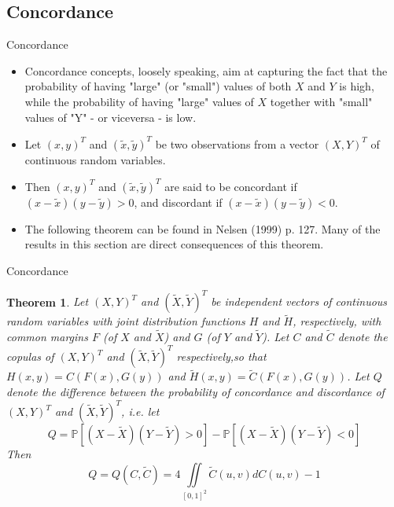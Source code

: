 \documentclass[11pt]{beamer}
\theoremstyle{plain}
\newtheorem{thm}{Theorem}[section]
\theoremstyle{definition}
\theoremstyle{remark}
\begin{document}
\subsection{Concordance}

\begin{frame}{Concordance}
   \begin{itemize}
      \item   				  						  
		Concordance concepts, loosely speaking, aim at capturing the fact that the 
		probability of having "large" (or "small") values of both $X$ and $Y$ is high, while 
		the probability of having "large" values of $X$ together with "small" values of "Y" 
		- or viceversa - is low.
	  \item 
	  	Let $(x, y)^T$ and $(\tilde x, \tilde y)^T$ be two observations from a vector $(X, Y 
	  	)^T$ of continuous random variables. 
	  \item		  	
	  	Then $(x, y)^T$ and $(\tilde x, \tilde y)^T$ 
	  	are said to be concordant if $(x - \tilde x)(y - \tilde y) > 0$, and discordant if $
	  	(x-\tilde x)(y-\tilde y) < 0$.
	  \item 
		The following theorem can be found in Nelsen (1999) p. 127. Many of the results in 	
		this section are direct consequences of this theorem.
   \end{itemize}
\end{frame}
%
\begin{frame}{Concordance}
	\begin{thm}
	Let $(X, Y )^T$ and $(\tilde X, \tilde Y )^T$ be independent vectors of continuous random variables with joint distribution functions $H$ 
	and $\tilde H$, respectively, with common margins $F$ (of $X$ and $\tilde X$) and $G$ (of $Y$ and $\tilde Y$). Let $C$ and $\tilde C
	$ denote the copulas of $(X, Y )^T$ and $(\tilde X, \tilde Y )^T$ respectively,so that $H(x,y)=C(F(x),G(y))$ and $\tilde H(x,y)= \tilde 
	C(F(x),G(y))$. Let $Q$ denote the difference between the probability of concordance and discordance of $(X, Y )^T$ and $(\tilde X, 
	\tilde Y )^T$,  i.e. let
	\begin{equation}
    	Q=\mathbb{P}[(X-\tilde X)(Y-\tilde Y) > 0]-\mathbb{P}[(X-\tilde X)(Y-\tilde Y) < 0] 
	\end{equation}	
	Then
	\begin{equation}
			Q=Q(C, \tilde C) = 4 \iint\limits_{[0,1]^2} \tilde C (u,v) dC(u,v) -1
	\end{equation}
    \end{thm}
\end{frame}
\end{document}
